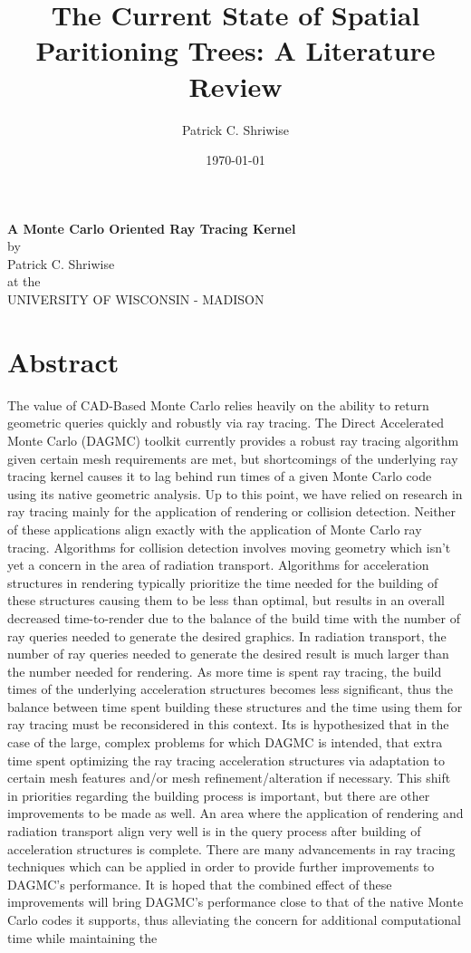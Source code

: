 \documentclass[10pt, a4paper]{article}
\title{\textbf{The Current State of Spatial Paritioning Trees: A Literature Review}}
\author{Patrick C. Shriwise}
\date{\today}
\begin{document}
\begin{center}
  \textbf{A Monte Carlo Oriented Ray Tracing Kernel} \\
  \bigskip
  by \\
  \bigskip
  Patrick C. Shriwise \\
  \bigskip 
  at the \\
  \bigskip
  UNIVERSITY OF WISCONSIN - MADISON \\
\end{center}

\newpage
\tableofcontents 

\section{Abstract}%

The value of CAD-Based Monte Carlo relies heavily on the ability to return geometric queries quickly and robustly via ray tracing. The Direct Accelerated Monte Carlo (DAGMC) toolkit currently provides a robust ray tracing algorithm\cite{thesis_smith_2010} given certain mesh requirements are met, but shortcomings of the underlying ray tracing kernel causes it to lag behind run times of a given Monte Carlo code using its native geometric analysis. Up to this point, we have relied on research in ray tracing mainly for the application of rendering or collision detection. Neither of these applications align exactly with the application of Monte Carlo ray tracing. Algorithms for collision detection involves moving geometry which isn’t yet a concern in the area of radiation transport. Algorithms for acceleration structures in rendering typically prioritize the time needed for the building of these structures causing them to be less than optimal, but results in an overall decreased time-to-render due to the balance of the build time with the number of ray queries needed to generate the desired graphics. In radiation transport, the number of ray queries needed to generate the desired result is much larger than the number needed for rendering. As more time is spent ray tracing, the build times of the underlying acceleration structures becomes less significant, thus the balance between time spent building these structures and the time using them for ray tracing must be reconsidered in this context. Its is hypothesized that in the case of the large, complex problems for which DAGMC is intended, that extra time spent optimizing the ray tracing acceleration structures via adaptation to certain mesh features and/or mesh refinement/alteration if necessary. This shift in priorities regarding the building process is important, but there are other improvements to be made as well. An area where the application of rendering and radiation transport align very well is in the query process after building of acceleration structures is complete. There are many advancements in ray tracing techniques which can be applied in order to provide further improvements to DAGMC’s performance. It is hoped that the combined effect of these improvements will bring DAGMC’s performance close to that of the native Monte Carlo codes it supports, thus alleviating the concern for additional computational time while maintaining the 
\end{document}
